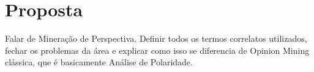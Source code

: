 

\section{Proposta}

Falar de Mineração de Perspectiva. Definir todos os termos correlatos utilizados, fechar os problemas da área e explicar como isso se diferencia de Opinion Mining clássica, que é basicamente Análise de Polaridade.



